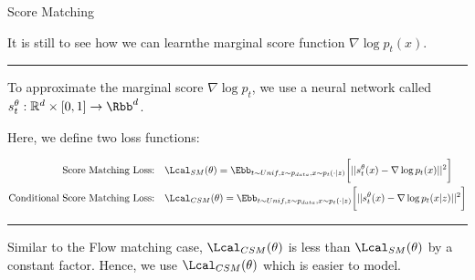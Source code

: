 \documentclass[aspectratio=169,xcolor=dvipsnames,svgnames,x11names,fleqn]{beamer}
\begin{document}
\begin{frame}{Score Matching}

    \footnotesize

It is still to see how we can learnthe marginal score function $\nabla \log p_t(x)$.

        \vspace{10pt}

    {\color{forestGreen}\hrule}

    \vspace{10pt}

    To approximate the marginal score $\nabla \log p_t$, we use a neural network called  $s_t^\theta: \mathbb{R}^d \times [0, 1] \to \Rbb^d$.

    Here, we define two loss functions:

    \begin{align*}
        \text{Score Matching Loss:~~~} & \Lcal_{SM}(\theta) = \Ebb_{t\sim Unif, z \sim p_{data}, x\sim p_t(\cdot | z)} \bigg[ || s_t^\theta(x)  - \nabla \log p_t(x) || ^2 \bigg]\\
        \text{Conditional Score Matching Loss:~~~} & \Lcal_{CSM}(\theta) = \Ebb_{t\sim Unif, z \sim p_{data}, x\sim p_t(\cdot | z)} \bigg[ || s_t^\theta(x)  - \nabla \log p_t(x|z) || ^2 \bigg]\\
    \end{align*}

            \vspace{10pt}

    {\color{hunterGreen}\hrule}

    \vspace{10pt}

    Similar to the Flow matching case, $\Lcal_{CSM}(\theta)$ is less than $\Lcal_{SM}(\theta)$ by a constant factor. Hence, we use $\Lcal_{CSM}(\theta)$ which is easier to model.
\end{frame}
\end{document}
